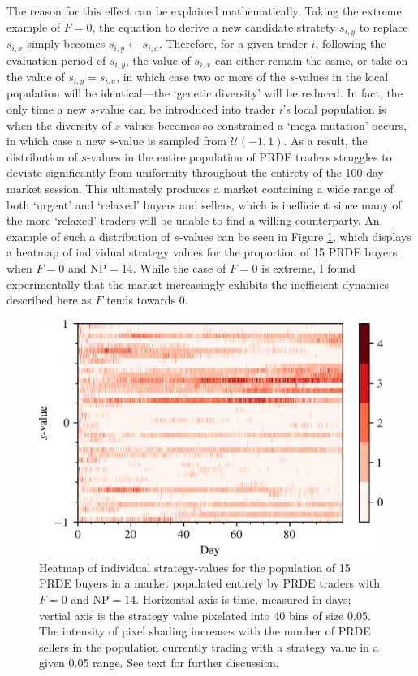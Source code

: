 \documentclass[conference]{IEEEtran}
\begin{document}
The reason for this effect can be explained mathematically.
Taking the extreme example of $F=0$, the equation to derive a new candidate stratety $s_{i,y}$ to replace $s_{i,x}$ simply becomes $s_{i,y}\leftarrow s_{i,a}$.
Therefore, for a given trader $i$, following the evaluation period of $s_{i,y}$, the value of $s_{i,x}$ can either remain the same, or take on the value of $s_{i,y}=s_{i,a}$, in which case two or more of the $s$-values in the local population will be identical---the `genetic diversity' will be reduced.
In fact, the only time a new $s$-value can be introduced into trader $i$'s local population is when the diversity of $s$-values becomes so constrained a `mega-mutation' occurs, in which case a new $s$-value is sampled from $\mathcal{U}(-1,1)$.
As a result, the distribution of $s$-values in the entire population of PRDE traders struggles to deviate significantly from uniformity throughout the entirety of the 100-day market session.
This ultimately produces a market containing a wide range of both `urgent' and `relaxed' buyers and sellers, which is inefficient since many of the more `relaxed' traders will be unable to find a willing counterparty.
An example of such a distribution of $s$-values can be seen in Figure \ref{k=14,F=0.0_buy_strats}, which displays a heatmap of individual strategy values for the proportion of 15 PRDE buyers when $F=0$ and $\mathrm{NP}=14$.
While the case of $F=0$ is extreme, I found experimentally that the market increasingly exhibits the inefficient dynamics described here as $F$ tends towards $0$.

\begin{figure}[htbp]
    \centerline{\includegraphics[width=\columnwidth]{k=14,F=0.0_buy_strats.png}}
    \caption{
        Heatmap of individual strategy-values for the population of 15 PRDE buyers in a market populated entirely by PRDE traders with $F=0$ and $\mathrm{NP}=14$.
        Horizontal axis is time, measured in days; vertial axis is the strategy value pixelated into 40 bins of size 0.05.
        The intensity of pixel shading increases with the number of PRDE sellers in the population currently trading with a strategy value in a given 0.05 range.
        See text for further discussion.
    }
    \label{k=14,F=0.0_buy_strats}
\end{figure}
\end{document}
